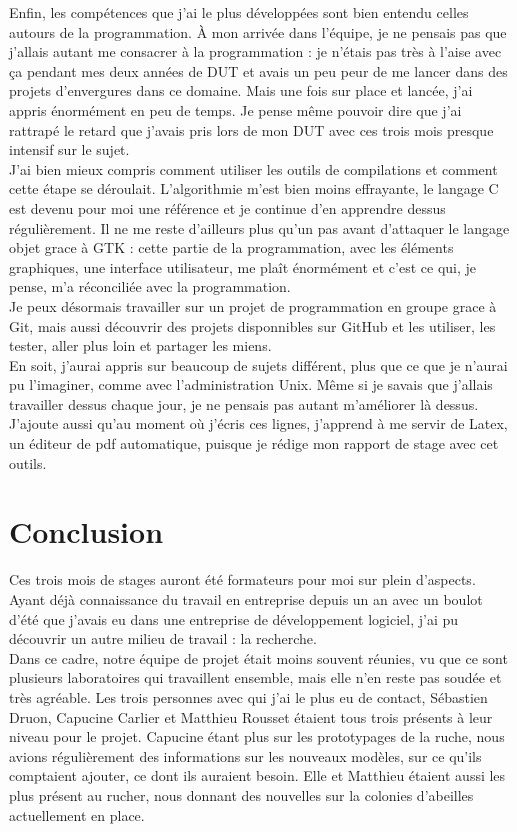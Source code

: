 \documentclass[11pt,french,a4paper]{report}
\begin{document}
Enfin, les compétences que j'ai le plus développées sont bien entendu celles autours de la programmation. À mon arrivée dans l'équipe, je ne pensais
pas que j'allais autant me consacrer à la programmation : je n'étais pas très à l'aise avec ça pendant mes deux années de DUT et avais un peu peur
de me lancer dans des projets d'envergures dans ce domaine. Mais une fois sur place et lancée, j'ai appris énormément en peu de temps. Je pense
même pouvoir dire que j'ai rattrapé le retard que j'avais pris lors de mon DUT avec ces trois mois presque intensif sur le sujet. \\
J'ai bien mieux compris comment utiliser les outils de compilations et comment cette étape se déroulait. L'algorithmie m'est bien moins
effrayante, le langage C est devenu pour moi une référence et je continue d'en apprendre dessus régulièrement. Il ne me reste d'ailleurs 
plus qu'un pas avant d'attaquer le langage objet grace à GTK : cette partie de la programmation, avec les éléments graphiques, une interface
utilisateur, me plaît énormément et c'est ce qui, je pense, m'a réconciliée avec la programmation. \\
Je peux désormais travailler sur un projet de programmation en groupe grace à Git, mais aussi découvrir des projets disponnibles sur GitHub et les 
utiliser, les tester, aller plus loin et partager les miens. \\

En soit, j'aurai appris sur beaucoup de sujets différent, plus que ce que je n'aurai pu l'imaginer, comme avec l'administration Unix.
Même si je savais que j'allais travailler dessus chaque jour, je ne pensais pas autant m'améliorer là dessus. J'ajoute aussi qu'au moment
où j'écris ces lignes, j'apprend à me servir de Latex, un éditeur de pdf automatique, puisque je rédige mon rapport de stage avec cet outils. 


\chapter{Conclusion}

Ces trois mois de stages auront été formateurs pour moi sur plein d'aspects. Ayant déjà connaissance du travail en entreprise depuis un an
avec un boulot d'été que j'avais eu dans une entreprise de développement logiciel, j'ai pu découvrir un autre milieu de travail : la recherche. \\
Dans ce cadre, notre équipe de projet était moins souvent réunies, vu que ce sont plusieurs laboratoires qui travaillent ensemble, mais 
elle n'en reste pas soudée et très agréable. Les trois personnes avec qui j'ai le plus eu de contact, Sébastien Druon, Capucine Carlier et Matthieu Rousset
étaient tous trois présents à leur niveau pour le projet. Capucine étant plus sur les prototypages de la ruche, nous avions régulièrement des informations 
sur les nouveaux modèles, sur ce qu'ils comptaient ajouter, ce dont ils auraient besoin. Elle et Matthieu étaient aussi les plus présent au rucher, 
nous donnant des nouvelles sur la colonies d'abeilles actuellement en place. 
\end{document}
